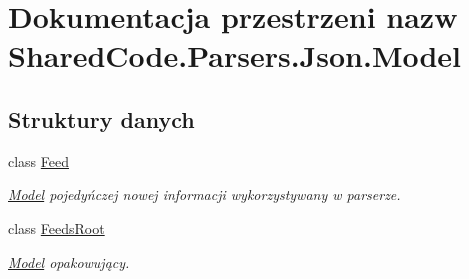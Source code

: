 \hypertarget{a00312}{}\section{Dokumentacja przestrzeni nazw Shared\+Code.\+Parsers.\+Json.\+Model}
\label{a00312}
\subsection*{Struktury danych}
\begin{DoxyCompactItemize}
\item 
class \hyperlink{a00019}{Feed}
\begin{DoxyCompactList}\small\item\em \hyperlink{a00312}{Model} pojedyńczej nowej informacji wykorzystywany w parserze. \end{DoxyCompactList}\item 
class \hyperlink{a00020}{Feeds\+Root}
\begin{DoxyCompactList}\small\item\em \hyperlink{a00312}{Model} opakowujący. \end{DoxyCompactList}\end{DoxyCompactItemize}
